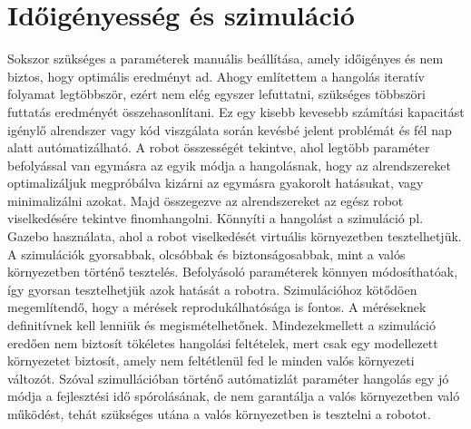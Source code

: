 \section{Időigényesség és szimuláció}
Sokszor szükséges a paraméterek manuális beállítása, amely időigényes és nem biztos, hogy optimális eredményt ad. Ahogy említettem a hangolás iteratív folyamat legtöbbször, ezért nem elég egyszer lefuttatni, szükséges többszöri futtatás eredményét összehasonlítani. Ez egy kisebb kevesebb számítási kapacitást igénylő alrendszer vagy kód viszgálata során kevésbé jelent problémát és fél nap alatt autómatizálható. A robot összességét tekintve, ahol legtöbb paraméter befolyással van egymásra az egyik módja a hangolásnak, hogy az alrendszereket optimalizáljuk megpróbálva kizárni az egymásra gyakorolt hatásukat, vagy minimalizálni azokat. Majd összegezve az alrendszereket az egész robot viselkedésére tekintve finomhangolni. Könnyíti a hangolást a szimuláció pl. Gazebo használata, ahol a robot viselkedését virtuális környezetben tesztelhetjük. A szimulációk gyorsabbak, olcsóbbak és biztonságosabbak, mint a valós környezetben történő tesztelés. Befolyásoló paraméterek könnyen módosíthatóak, így gyorsan tesztelhetjük azok hatását a robotra. Szimulációhoz kötődöen megemlítendő, hogy a mérések reprodukálhatósága is fontos. A méréseknek definitívnek kell lenniük és megismételhetőnek. Mindezekmellett a szimuláció eredően nem biztosít tökéletes hangolási feltételek, mert csak egy modellezett környezetet biztosít, amely nem feltétlenül fed le minden valós környezeti változót. Szóval szimullációban történő autómatizlát paraméter hangolás egy jó módja a fejlesztési idő spórolásának, de nem garantálja a valós környezetben való működést, tehát szükséges utána a valós környezetben is tesztelni a robotot.

